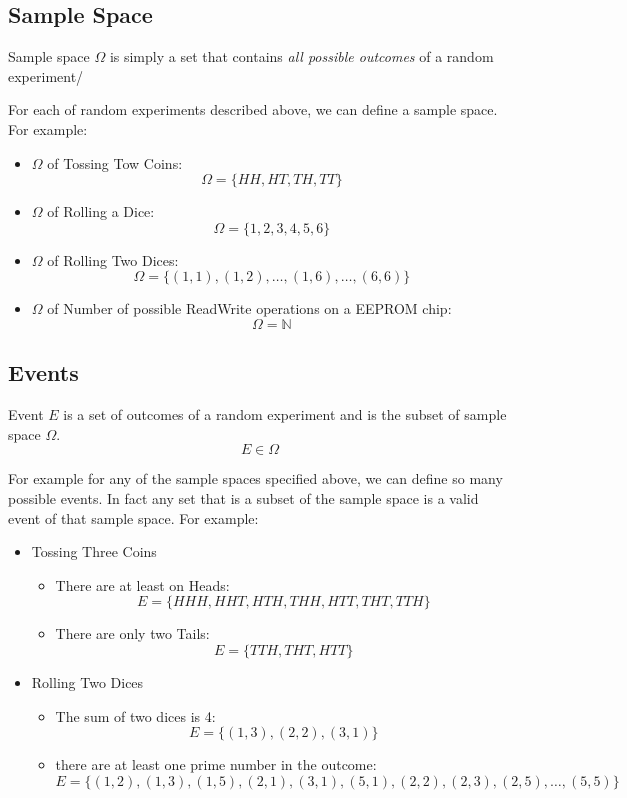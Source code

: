 \subsection{Sample Space}

\begin{definition}
	
	Sample space $\Omega$ is simply a set that contains \emph{all possible outcomes} of a random experiment/
	
\end{definition}

For each of random experiments described above, we can define a sample space. For example:

\begin{itemize}
	\item $\Omega$ of Tossing Tow Coins: $$\Omega = \{ HH,HT,TH,TT \}$$
	\item $\Omega$ of Rolling a Dice: $$\Omega = \{ 1,2,3,4,5,6 \}$$
	\item $\Omega$ of Rolling Two Dices: $$\Omega = \{ (1,1),(1,2), \ldots, (1,6), \ldots ,(6,6)  \}$$
	\item $\Omega$ of Number of possible ReadWrite operations on a EEPROM chip: $$\Omega = \mathbb{N}$$
\end{itemize}



\subsection{Events}
\begin{definition}[Events]
	Event $E$ is a set of outcomes of a random experiment and is the subset of sample space $\Omega$. 
	$$E \in \Omega$$
\end{definition}


For example for any of the sample spaces specified above, we can define so many possible events. In fact any set that is a subset of the sample space is a valid event of that sample space. For example:

\begin{itemize}
	
	\item Tossing Three Coins
	\begin{itemize}
		\item There are at least on Heads: $$E = \{ HHH,HHT,HTH,THH,HTT,THT,TTH \}$$
		\item There are only two Tails: $$E = \{ TTH,THT,HTT \}$$
	\end{itemize}
	
	\item Rolling Two Dices
	\begin{itemize}
		\item The sum of two dices is 4: $$E = \{ (1,3),(2,2),(3,1) \}$$
		\item there are at least one prime number in the outcome:
		$$E = \{ (1,2),(1,3),(1,5),(2,1),(3,1),(5,1),(2,2),(2,3),(2,5), \ldots ,(5,5)\}$$
	\end{itemize}
	
\end{itemize}


